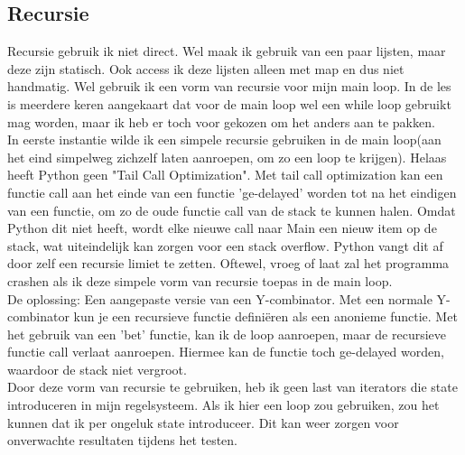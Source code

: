 \documentclass[a4paper]{report}
\begin{document}
\subsection{Recursie}
\label{sec:recursion}
Recursie gebruik ik niet direct. Wel maak ik gebruik van een paar lijsten, maar deze zijn statisch. Ook access ik deze lijsten alleen met map en dus niet handmatig.
Wel gebruik ik een vorm van recursie voor mijn main loop. 
In de les is meerdere keren aangekaart dat voor de main loop wel een while loop gebruikt mag worden, maar ik heb er toch voor gekozen om het anders aan te pakken.
\\ 
In eerste instantie wilde ik een simpele recursie gebruiken in de main loop(aan het eind simpelweg zichzelf laten aanroepen, om zo een loop te krijgen). 
Helaas heeft Python geen "Tail Call Optimization". Met tail call optimization kan een functie call aan het einde van een functie 'ge-delayed' worden tot na het eindigen van een functie, om zo de oude functie call van de stack te kunnen halen\cite{enwiki:1178996948}.
Omdat Python dit niet heeft, wordt elke nieuwe call naar Main een nieuw item op de stack, wat uiteindelijk kan zorgen voor een stack overflow. Python vangt dit af door zelf een recursie limiet te zetten. 
Oftewel, vroeg of laat zal het programma crashen als ik deze simpele vorm van recursie toepas in de main loop. 
\\
De oplossing: Een aangepaste versie van een Y-combinator\cite{enwiki:1179789531}.
Met een normale Y-combinator kun je een recursieve functie definiëren als een anonieme functie.
Met het gebruik van een 'bet' functie, kan ik de loop aanroepen, maar de recursieve functie call verlaat aanroepen\cite{baruchel2013tailrecursion}.
Hiermee kan de functie toch ge-delayed worden, waardoor de stack niet vergroot.
\\
Door deze vorm van recursie te gebruiken, heb ik geen last van iterators die state introduceren in mijn regelsysteem. 
Als ik hier een loop zou gebruiken, zou het kunnen dat ik per ongeluk state introduceer. Dit kan weer zorgen voor onverwachte resultaten tijdens het testen.
\end{document}
